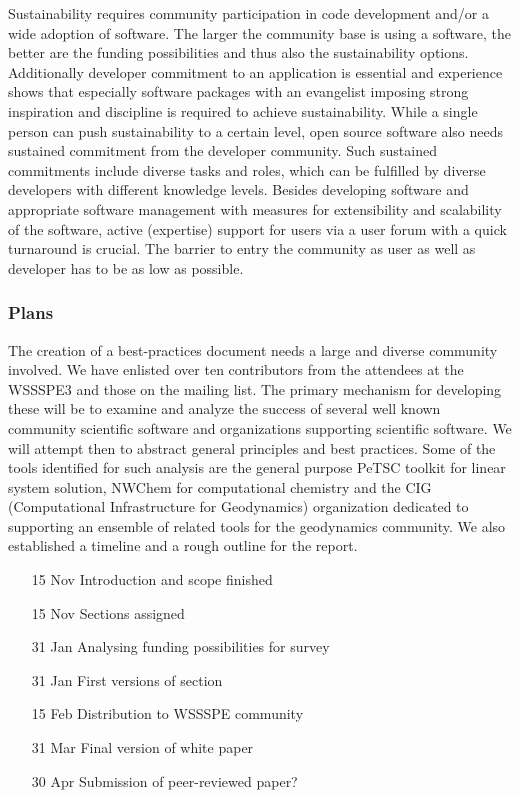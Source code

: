 Sustainability requires community participation in code development and/or a wide adoption of software. The larger the community base is using a software, the better are the funding possibilities and thus also the sustainability options. Additionally developer commitment to an application is essential and experience shows that especially software packages with an evangelist imposing strong inspiration and discipline is required to achieve sustainability.
While a single person can push sustainability to a certain level, open source software also needs sustained commitment from the developer community. Such sustained commitments include diverse tasks and roles, which can be fulfilled by diverse developers with different knowledge levels. Besides developing software and appropriate software management with measures for extensibility and scalability of the software, active (expertise) support for users via a user forum with a quick turnaround is crucial. The barrier to entry the community as user as well as developer has to be as low as possible.

\subsubsection{Plans}
The creation of a best-practices document needs a large and diverse community involved. We have enlisted over ten contributors from the attendees at the WSSSPE3 and 
those on the mailing list. The primary mechanism for developing these will be to examine and analyze the success of several well known community scientific
software and organizations supporting scientific software. We will attempt then to abstract general principles and best practices. Some of the tools identified for such analysis are
the general purpose PeTSC toolkit for linear system solution, NWChem for computational chemistry and the CIG (Computational Infrastructure for Geodynamics) organization dedicated to supporting an ensemble of related tools for the geodynamics community. 
We also established a timeline and a rough outline for the report.

\begin{itemize}
%
\item [15 Nov] Introduction and scope finished
\item [15 Nov] Sections assigned
\item [31 Jan] Analysing funding possibilities for survey
\item [31 Jan] First versions of section
\item [15 Feb] Distribution to WSSSPE community
\item [31 Mar] Final version of white paper
\item [30 Apr] Submission of peer-reviewed paper?
\end{itemize}


